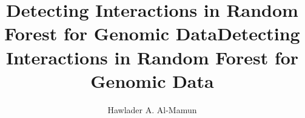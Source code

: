 \documentclass[authoryear,preprint,12pt,3p]{elsarticle}
\begin{document}
\begin{frontmatter}


\title{Detecting Interactions in Random Forest for Genomic Data}
\author{Hawlader A. Al-Mamun}

\title{Detecting Interactions in Random Forest for Genomic Data}


\author{} %



\end{frontmatter}
\end{document}
